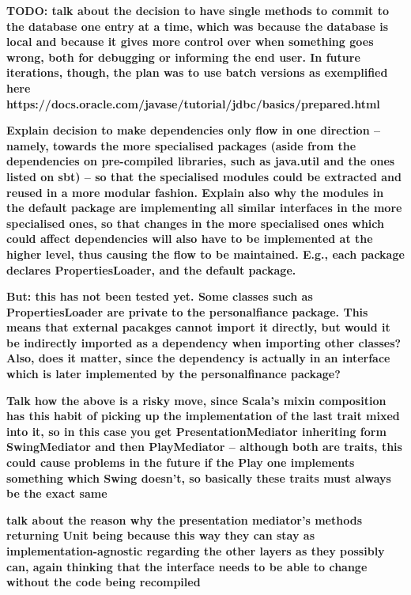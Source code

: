 \textbf{TODO: talk about the decision to have single methods to commit to the
database one entry at a time, which was because the database is local and
because it gives more control over when something goes wrong, both for
debugging or informing the end user. In future iterations, though, the plan was
to use batch versions as exemplified here
https://docs.oracle.com/javase/tutorial/jdbc/basics/prepared.html}

\textbf{Explain decision to make dependencies only flow in one direction --
namely, towards the more specialised packages (aside from the dependencies on
pre-compiled libraries, such as java.util and the ones listed on sbt) -- so
that the specialised modules could be extracted and reused in a more modular
fashion. Explain also why the modules in the default package are implementing
all similar interfaces in the more specialised ones, so that changes in the
more specialised ones which could affect dependencies will also have to be
implemented at the higher level, thus causing the flow to be maintained. E.g.,
each package declares PropertiesLoader, and the default package.}

\textbf{But: this has not been tested yet. Some classes such as PropertiesLoader are
private to the personalfiance package. This means that external pacakges cannot
import it directly, but would it be indirectly imported as a dependency when
importing other classes? Also, does it matter, since the dependency is actually
in an interface which is later implemented by the personalfinance package?}

\textbf{Talk how the above is a risky move, since Scala's mixin composition has
this habit of picking up the implementation of the last trait mixed into it, so
in this case you get PresentationMediator inheriting form SwingMediator and
then PlayMediator -- although both are traits, this could cause problems in the
future if the Play one implements something which Swing doesn't, so basically
these traits must always be the exact same}

\textbf{talk about the reason why the presentation mediator's methods returning
Unit being because this way they can stay as implementation-agnostic regarding
the other layers as they possibly can, again thinking that the interface needs
to be able to change without the code being recompiled}

